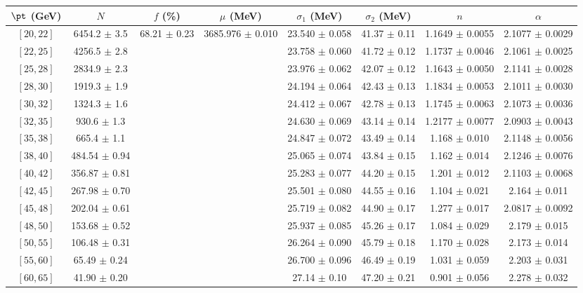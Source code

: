 \begin{tabular}{c||c|c|c|c|c|c|c}
$\pt$ (GeV) & $N$ & $f$ (\%) & $\mu$ (MeV) & $\sigma_1$ (MeV) & $\sigma_2$ (MeV) & $n$ & $\alpha$ \\
\hline
$[20, 22]$ & 6454.2 $\pm$ 3.5 & \multirow{20}{*}{68.21 $\pm$ 0.23} & \multirow{20}{*}{3685.976 $\pm$ 0.010} & 23.540 $\pm$ 0.058 & 41.37 $\pm$ 0.11 & 1.1649 $\pm$ 0.0055 & 2.1077 $\pm$ 0.0029\\
$[22, 25]$ & 4256.5 $\pm$ 2.8 &  &  & 23.758 $\pm$ 0.060 & 41.72 $\pm$ 0.12 & 1.1737 $\pm$ 0.0046 & 2.1061 $\pm$ 0.0025\\
$[25, 28]$ & 2834.9 $\pm$ 2.3 &  &  & 23.976 $\pm$ 0.062 & 42.07 $\pm$ 0.12 & 1.1643 $\pm$ 0.0050 & 2.1141 $\pm$ 0.0028\\
$[28, 30]$ & 1919.3 $\pm$ 1.9 &  &  & 24.194 $\pm$ 0.064 & 42.43 $\pm$ 0.13 & 1.1834 $\pm$ 0.0053 & 2.1011 $\pm$ 0.0030\\
$[30, 32]$ & 1324.3 $\pm$ 1.6 &  &  & 24.412 $\pm$ 0.067 & 42.78 $\pm$ 0.13 & 1.1745 $\pm$ 0.0063 & 2.1073 $\pm$ 0.0036\\
$[32, 35]$ & 930.6 $\pm$ 1.3 &  &  & 24.630 $\pm$ 0.069 & 43.14 $\pm$ 0.14 & 1.2177 $\pm$ 0.0077 & 2.0903 $\pm$ 0.0043\\
$[35, 38]$ & 665.4 $\pm$ 1.1 &  &  & 24.847 $\pm$ 0.072 & 43.49 $\pm$ 0.14 & 1.168 $\pm$ 0.010 & 2.1148 $\pm$ 0.0056\\
$[38, 40]$ & 484.54 $\pm$ 0.94 &  &  & 25.065 $\pm$ 0.074 & 43.84 $\pm$ 0.15 & 1.162 $\pm$ 0.014 & 2.1246 $\pm$ 0.0076\\
$[40, 42]$ & 356.87 $\pm$ 0.81 &  &  & 25.283 $\pm$ 0.077 & 44.20 $\pm$ 0.15 & 1.201 $\pm$ 0.012 & 2.1103 $\pm$ 0.0068\\
$[42, 45]$ & 267.98 $\pm$ 0.70 &  &  & 25.501 $\pm$ 0.080 & 44.55 $\pm$ 0.16 & 1.104 $\pm$ 0.021 & 2.164 $\pm$ 0.011\\
$[45, 48]$ & 202.04 $\pm$ 0.61 &  &  & 25.719 $\pm$ 0.082 & 44.90 $\pm$ 0.17 & 1.277 $\pm$ 0.017 & 2.0817 $\pm$ 0.0092\\
$[48, 50]$ & 153.68 $\pm$ 0.52 &  &  & 25.937 $\pm$ 0.085 & 45.26 $\pm$ 0.17 & 1.084 $\pm$ 0.029 & 2.179 $\pm$ 0.015\\
$[50, 55]$ & 106.48 $\pm$ 0.31 &  &  & 26.264 $\pm$ 0.090 & 45.79 $\pm$ 0.18 & 1.170 $\pm$ 0.028 & 2.173 $\pm$ 0.014\\
$[55, 60]$ & 65.49 $\pm$ 0.24 &  &  & 26.700 $\pm$ 0.096 & 46.49 $\pm$ 0.19 & 1.031 $\pm$ 0.059 & 2.203 $\pm$ 0.031\\
$[60, 65]$ & 41.90 $\pm$ 0.20 &  &  & 27.14 $\pm$ 0.10 & 47.20 $\pm$ 0.21 & 0.901 $\pm$ 0.056 & 2.278 $\pm$ 0.032\\

\end{tabular}

